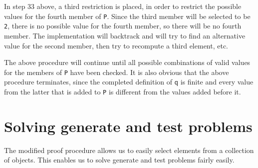 \documentclass[inscr,ack,preface]{dithesis}
\theoremstyle{definition}
\newcommand{\msf}[1]{$\mathsf{#1}$}
\begin{document}
In step 33 above, a third restriction is placed, in order to restrict the possible values for the fourth member of \texttt{P}. Since the third member will be selected to be \texttt{2}, there is no possible value for the fourth member, so there will be no fourth member. The implementation will backtrack and will try to find an alternative value for the second member, then try to recompute a third element, etc.

The above procedure will continue until all possible combinations of valid values for the members of \texttt{P} have been checked. It is also obvious that the above procedure terminates, since the completed definition of \msf{q} is finite and every value from the latter that is added to \texttt{P} is different from the values added before it.

\section{Solving generate and test problems}
The modified proof procedure allows us to easily select elements from a collection of objects. This enables us to solve generate and test problems fairly easily.
\end{document}

